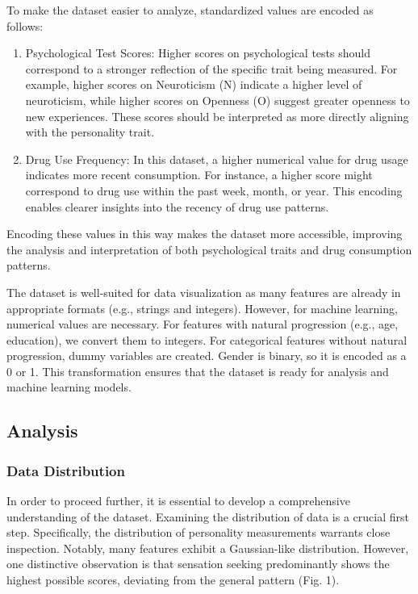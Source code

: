 \documentclass{article}
\begin{document}
To make the dataset easier to analyze, standardized values are encoded as follows:
\begin{enumerate}
    \item Psychological Test Scores: Higher scores on psychological tests should correspond to a stronger reflection of the specific trait being measured. For example, higher scores on Neuroticism (N) indicate a higher level of neuroticism, while higher scores on Openness (O) suggest greater openness to new experiences. These scores should be interpreted as more directly aligning with the personality trait.

    \item Drug Use Frequency: In this dataset, a higher numerical value for drug usage indicates more recent consumption. For instance, a higher score might correspond to drug use within the past week, month, or year. This encoding enables clearer insights into the recency of drug use patterns.

\end{enumerate}
    
Encoding these values in this way makes the dataset more accessible, improving the analysis and interpretation of both psychological traits and drug consumption patterns.

\hspace{1cm}The dataset is well-suited for data visualization as many features are already in appropriate formats (e.g., strings and integers). However, for machine learning, numerical values are necessary. For features with natural progression (e.g., age, education), we convert them to integers. For categorical features without natural progression, dummy variables are created. Gender is binary, so it is encoded as a 0 or 1. This transformation ensures that the dataset is ready for analysis and machine learning models.

\subsection{Analysis}

\subsubsection{Data Distribution}
\hspace{1cm}In order to proceed further, it is essential to develop a comprehensive understanding of the dataset. Examining the distribution of data is a crucial first step. Specifically, the distribution of personality measurements warrants close inspection. Notably, many features exhibit a Gaussian-like distribution. However, one distinctive observation is that sensation seeking predominantly shows the highest possible scores, deviating from the general pattern (Fig. 1).
\end{document}

